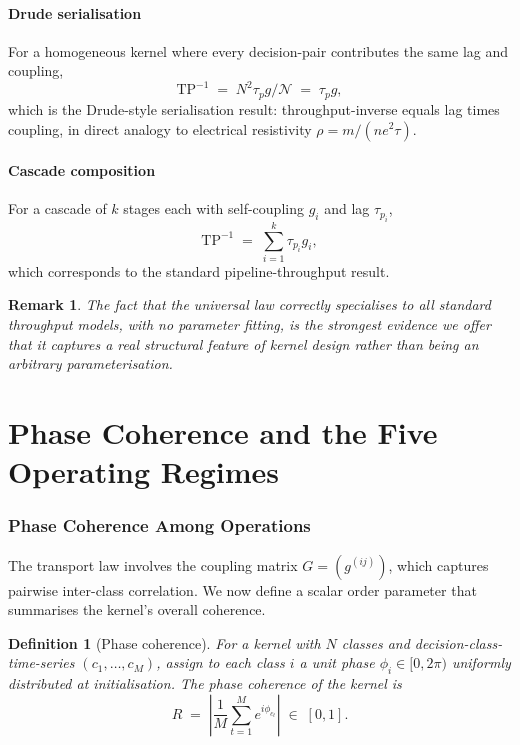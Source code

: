 \documentclass[twocolumn,11pt,a4paper]{article}
\newtheorem{definition}[theorem]{Definition}
\newtheorem{remark}[theorem]{Remark}
\newcommand{\TP}{\mathrm{TP}}
\newcommand{\taup}{\tau_p}
\newcommand{\Norm}{\mathcal{N}}
\newcommand{\Rens}{R}
\begin{document}
\subsection{Drude serialisation}

For a homogeneous kernel where every decision-pair contributes the same lag and coupling,
\[
\TP^{-1} \;=\; N^2 \taup g / \Norm \;=\; \taup g,
\]
which is the Drude-style serialisation result: throughput-inverse equals lag times coupling, in direct analogy to electrical resistivity $\rho = m/(ne^2\tau)$.

\subsection{Cascade composition}

For a cascade of $k$ stages each with self-coupling $g_i$ and lag $\taup_i$,
\[
\TP^{-1} \;=\; \sum_{i=1}^k \taup_i g_i,
\]
which corresponds to the standard pipeline-throughput result.

\begin{remark}
The fact that the universal law correctly specialises to all standard throughput models, with no parameter fitting, is the strongest evidence we offer that it captures a real structural feature of kernel design rather than being an arbitrary parameterisation.
\end{remark}

\part{Phase Coherence and the Five Operating Regimes}

\section{Phase Coherence Among Operations}
\label{sec:phase}

The transport law involves the coupling matrix $G = (g^{(ij)})$, which captures pairwise inter-class correlation. We now define a scalar order parameter that summarises the kernel's overall coherence.

\begin{definition}[Phase coherence]
\label{def:phase-coherence}
For a kernel with $N$ classes and decision-class-time-series $(c_1, \ldots, c_M)$, assign to each class $i$ a unit phase $\phi_i \in [0, 2\pi)$ uniformly distributed at initialisation. The \emph{phase coherence} of the kernel is
\[
\Rens \;=\; \left| \frac{1}{M}\sum_{t=1}^{M} e^{i\phi_{c_t}} \right| \;\in\; [0, 1].
\]
\end{definition}
\end{document}
